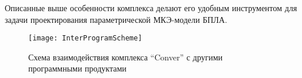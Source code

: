 Описанные выше особенности комплекса делают его удобным инструментом для задачи проектирования параметрической МКЭ-модели БПЛА. 

\begin{figure}
\centering
\def\svgwidth{0.8\textwidth}
%
\texttt{[image: InterProgramScheme]}
\caption{Схема взаимодействия комплекса ``Conver'' с другими программными продуктами}
\label{fig:InterProgramScheme}
\end{figure}


%